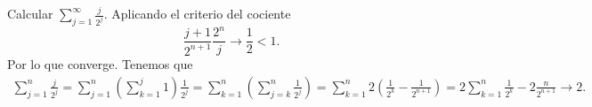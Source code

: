 \begin{eg}
\normalfont Calcular $\displaystyle \sum^{\infty}_{j = 1}\frac{j}{2^{j}} $. Aplicando el criterio del cociente
\[\frac{j+1}{2^{n+1}}\frac{2^{n}}{j} \to \frac{1}{2} < 1 .\]
Por lo que converge. Tenemos que
\[
\begin{split}
\sum^{n}_{j=1}\frac{j}{2^{j}} = \sum^{n}_{j=1}\left(\sum^{j}_{k=1}1\right)\frac{1}{2^{j}} = \sum^{n}_{k=1}\left(\sum^{n}_{j=k}\frac{1}{2^{j}}\right) = \sum^{n}_{k=1}2\left(\frac{1}{2^{k}}-\frac{1}{2^{n+1}}\right)  = 2\sum^{n}_{k=1}\frac{1}{2^{k}}-2\frac{n}{2^{n+1}} \to 2.
\end{split}
\]

\end{eg}



